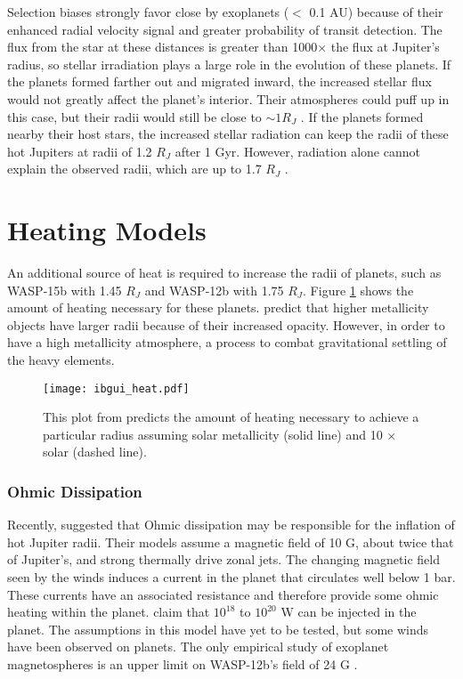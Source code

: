 \documentclass[twocolumn]{emulateapj}
\begin{document}
Selection biases strongly favor close by exoplanets ($< $ 0.1 AU) because of their enhanced radial velocity signal and greater probability of transit detection. The flux from the star at these distances is greater than 1000$\times$ the flux at Jupiter's radius, so stellar irradiation plays a large role in the evolution of these planets. If the planets formed farther out and migrated inward, the increased stellar flux would not greatly affect the planet's interior. Their atmospheres could puff up in this case, but their radii would still be close to $\sim 1 R_J$ \citep{burrows2000}. If the planets formed nearby their host stars, the increased stellar radiation can keep the radii of these hot Jupiters at radii of 1.2 $R_J$ after 1 Gyr. However, radiation alone cannot explain the observed radii, which are up to 1.7 $R_J$ \citep{fortneyRev10}.

\section{Heating Models}
An additional source of heat is required to increase the radii of planets, such as WASP-15b with 1.45 $R_J$ and WASP-12b with 1.75 $R_J$. Figure \ref{ibguiheat} shows the amount of heating necessary for these planets. \citet{ibgui2010} predict that higher metallicity objects have larger radii because of their increased opacity. However, in order to have a high metallicity atmosphere, a process to combat gravitational settling of the heavy elements.
\begin{figure}[!htbp]
\begin{center}
\texttt{[image: ibgui\_heat.pdf]}
\caption{This plot from \citet{ibgui2010} predicts the amount of heating necessary to achieve a particular radius assuming solar metallicity (solid line) and 10 $\times$ solar (dashed line).}
\label{ibguiheat}
\end{center}
\end{figure}
\subsubsection{Ohmic Dissipation}
Recently, \citet{batygin10} suggested that Ohmic dissipation may be responsible for the inflation of hot Jupiter radii. Their models assume a magnetic field of 10 G, about twice that of Jupiter's, and strong thermally drive zonal jets. The changing magnetic field seen by the winds induces a current in the planet that circulates well below 1 bar. These currents have an associated resistance and therefore provide some ohmic heating within the planet. \citet{batygin10} claim that $10^18$ to $10^20$ W can be injected in the planet. The assumptions in this model have yet to be tested, but some winds have been observed on planets. The only empirical study of exoplanet magnetospheres is an upper limit on WASP-12b's field of 24 G \citep{vidotto10}.
\end{document}
